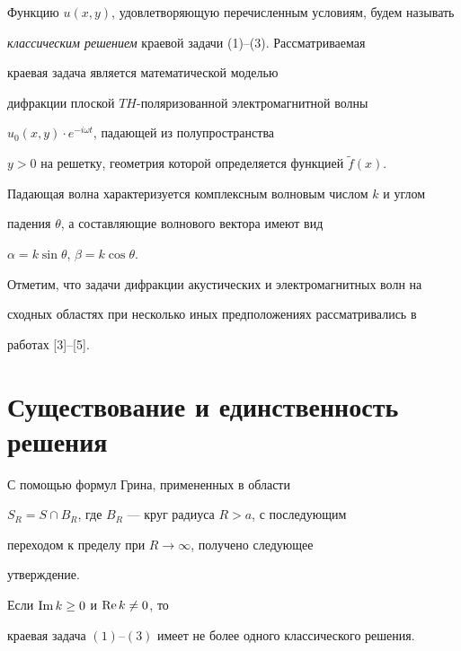 Функцию $u(x,y)$, удовлетворяющую перечисленным условиям, будем называть


{\it классическим решением} краевой задачи (1)--(3). Рассматриваемая


краевая задача является математической моделью


дифракции плоской $TH$-поляризованной электромагнитной волны


$u_0 (x,y) \cdot \displaystyle e^{-i \omega t}$, падающей из полупространства


$y>0$ на решетку, геометрия которой определяется функцией $\widetilde{f} (x)$.


Падающая волна характеризуется комплексным волновым числом $k$ и углом


падения $\theta$, а составляющие волнового вектора имеют вид


$\alpha = k \sin \theta$, $\beta = k \cos \theta$.





Отметим, что задачи дифракции акустических и электромагнитных волн на


сходных областях при несколько иных предположениях рассматривались в


работах [3]--[5].





\section{Существование и единственность решения}





С помощью формул Грина, примененных в области


$S_R = S \cap B_R$, где $B_R$ --- круг радиуса $R>a$, с последующим


переходом к пределу при $R \rightarrow \infty$, получено следующее


утверждение.





\begin{thm}


Если $\operatorname{Im} k \geq 0$ и $\operatorname{Re} k \neq 0$, то


краевая задача $(1)$--$(3)$ имеет не более одного классического решения.


\end{thm}





